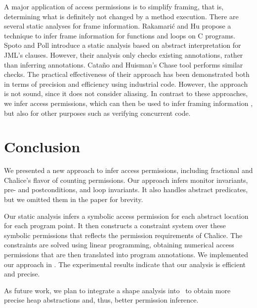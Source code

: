 \documentclass{llncs}
\begin{document}
A major application of access permissions is to simplify framing, that
is, determining what is definitely not changed by a method
execution. There are several static analyses for frame information.
Rakamari\'{c} and Hu \cite{RH08} propose a technique to infer frame
information for functions and loops on C programs.  Spoto and Poll
\cite{SP03} introduce a static analysis based on abstract
interpretation for JML's  clauses. However,
their analysis only checks existing annotations, rather than inferring
annotations.  Cata{\~n}o and Huisman's Chase tool \cite{CH03} performs
similar checks. The practical effectiveness of their approach has been
demonstrated both in terms of precision and efficiency using
industrial code. However, the approach is not sound, since it does not
consider aliasing. In contrast to these approaches, we infer access
permissions, which can then be used to infer framing information
\cite{SJP09}, but also for other purposes such as verifying concurrent
code.





\goup
\section{Conclusion}
\goup
\label{sect:conclusion}

We presented a new approach to infer access permissions, including
fractional and Chalice's flavor of counting permissions. Our approach
infers monitor invariants, pre- and postconditions, and loop
invariants. It also handles abstract predicates, but we omitted them
in the paper for brevity.

Our static analysis infers a symbolic access permission for each
abstract location for each program point. It then constructs a
constraint system over these symbolic permissions that reflects the
permission requirements of Chalice.  The constraints are solved using
linear programming, obtaining numerical access permissions that are
then translated into program annotations. We implemented our approach
in \Sample. The experimental results indicate that our analysis is
efficient and precise.

As future work, we plan to integrate a shape analysis \cite{LS00} into
\Sample\ to obtain more precise heap abstractions and, thus, better
permission inference.
\end{document}
